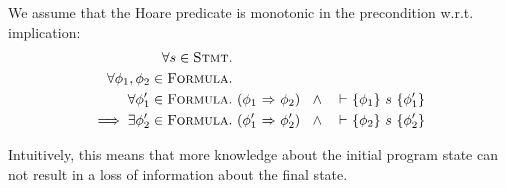 \begin{description}
    \begin{lemma}
        \label{ass:hl-mono}
        We assume that the Hoare predicate is monotonic in the precondition w.r.t. implication:
        \begin{align*}
        \forall s \in \textup{\textsc{Stmt}}.~& \\
        \forall \phi_1, \phi_2 \in \textup{\textsc{Formula}}.~&\\
        \forall \phi_1' \in \textup{\textsc{Formula}}.~&
        ({\phi_1} \,\,{\Rightarrow}\,\, {\phi_2}) ~~\wedge~ {~} \,\,{\vdash}\,\, \{{\phi_1}\} ~{s}~ \{{\phi_1'}\}\\
        \implies
        \exists \phi_2' \in \textup{\textsc{Formula}}.~&
        ({\phi_1'} \,\,{\Rightarrow}\,\, {\phi_2'}) ~~\wedge~ {~} \,\,{\vdash}\,\, \{{\phi_2}\} ~{s}~ \{{\phi_2'}\}
        \end{align*}
    \end{lemma}
    Intuitively, this means that more knowledge about the initial program state can not result in a loss of information about the final state.
    
    \begin{comment}
    \begin{definition}[Weakest Static Precondition]~\\
        Let $\wsp : \setStmt \rightarrow \PP(\setProgramState)$ be defined as
        \begin{displaymath}
        \wsp(s) = \{~ \pi \in \setProgramState_s ~|~ \exists \phi_1, \phi_2 \in \setFormula.~ \thoare{~}{\phi_1}{s}{\phi_2} ~~\wedge~~ \evalphiGen{\pi}{\phi_1} ~\}
        \end{displaymath}
    \end{definition}
    Intuitively, the $\wsp(s)$ is a predicate on program states, indicating whether we could deduce anything about the state after executing $s$, using only our Hoare rules.
    
    Example:
    \begin{itemize}
        \item 
        Given that
        \begin{mathpar}
            \inferrule* [Right=HoareAssign]
            {
                ~
            }
            {
                \thoare {~} {\phi[e/x]} {\sVarAssign {${x}$} {${e}$}} {\phi}
            }
        \end{mathpar}
        is the only Hoare rule for assignment, it follows that
        \begin{displaymath}
        \wsp(\sVarAssign {${x}$} {${e}$}) = \setProgramState
        \end{displaymath}
        

\end{comment}
\end{description}
